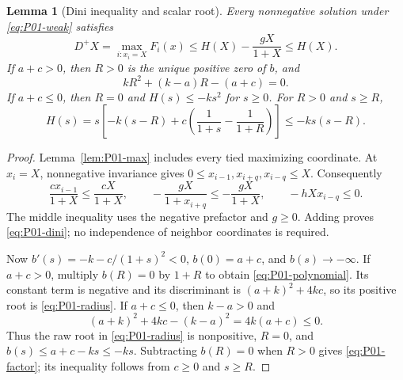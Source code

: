 \documentclass[11pt]{article}
\newtheorem{lemma}[theorem]{Lemma}
\theoremstyle{definition}
\theoremstyle{remark}
\begin{document}
\begin{lemma}[Dini inequality and scalar root]
\label{lem:P01-bound}
Every nonnegative solution under \eqref{eq:P01-weak} satisfies
\begin{equation}
\label{eq:P01-dini}
 D^+X=\max_{i:x_i=X}F_i(x)
       \le H(X)-\frac{gX}{1+X}\le H(X).
\end{equation}
If $a+c>0$, then $R>0$ is the unique positive zero of $b$, and
\begin{equation}
\label{eq:P01-polynomial}
 kR^2+(k-a)R-(a+c)=0.
\end{equation}
If $a+c\le0$, then $R=0$ and $H(s)\le-ks^2$ for $s\ge0$.
For $R>0$ and $s\ge R$,
\begin{equation}
\label{eq:P01-factor}
 H(s)=s\left[-k(s-R)
    +c\left(\frac1{1+s}-\frac1{1+R}\right)\right]\le-ks(s-R).
\end{equation}
\end{lemma}
\begin{proof}
Lemma~\ref{lem:P01-max} includes every tied maximizing coordinate.
At $x_i=X$, nonnegative invariance gives
$0\le x_{i-1},x_{i+q},x_{i-q}\le X$. Consequently
\[
 \frac{c x_{i-1}}{1+X}\le\frac{cX}{1+X},\qquad
 -\frac{gX}{1+x_{i+q}}\le-\frac{gX}{1+X},\qquad
 -hXx_{i-q}\le0.
\]
The middle inequality uses the negative prefactor and $g\ge0$.
Adding proves \eqref{eq:P01-dini}; no independence of neighbor
coordinates is required.

Now $b'(s)=-k-c/(1+s)^2<0$, $b(0)=a+c$, and $b(s)\to-\infty$.
If $a+c>0$, multiply $b(R)=0$ by $1+R$ to obtain
\eqref{eq:P01-polynomial}. Its constant term is negative and its
discriminant is $(a+k)^2+4kc$, so its positive root is
\eqref{eq:P01-radius}. If $a+c\le0$, then $k-a>0$ and
\[
 (a+k)^2+4kc-(k-a)^2=4k(a+c)\le0.
\]
Thus the raw root in \eqref{eq:P01-radius} is nonpositive, $R=0$,
and $b(s)\le a+c-ks\le-ks$. Subtracting $b(R)=0$ when $R>0$
gives \eqref{eq:P01-factor}; its inequality follows from $c\ge0$
and $s\ge R$.
\end{proof}
\end{document}

